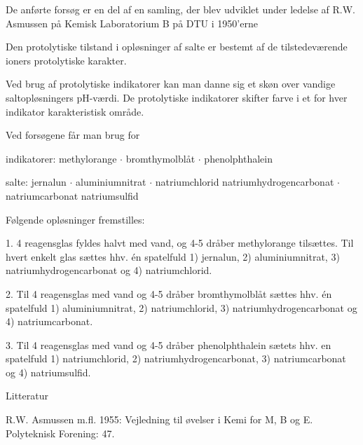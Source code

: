 



De anførte forsøg er en del af en samling, der blev udviklet under ledelse af R.W. Asmussen på Kemisk Laboratorium B på DTU i 1950'erne

Den protolytiske tilstand i opløsninger af salte er bestemt af de tilstedeværende ioners protolytiske karakter.

Ved brug af protolytiske indikatorer kan man danne sig et skøn over vandige saltopløsningers pH-værdi. De protolytiske indikatorer skifter farve i et for hver indikator karakteristisk område.



Ved forsøgene får man brug for

indikatorer: methylorange $\cdotp$ bromthymolblåt $\cdotp$ phenolphthalein

salte: jernalun $\cdotp$ aluminiumnitrat $\cdotp$ natriumchlorid
       natriumhydrogencarbonat $\cdotp$ natriumcarbonat
                                natriumsulfid




Følgende opløsninger fremstilles:

1. 4 reagensglas fyldes halvt med vand, og 4-5 dråber methylorange tilsættes. Til hvert enkelt glas sættes hhv. én spatelfuld 1) jernalun, 2) aluminiumnitrat, 3) natriumhydrogencarbonat og 4) natriumchlorid.

2. Til 4 reagensglas med vand og 4-5 dråber bromthymolblåt sættes hhv. én spatelfuld 1) aluminiumnitrat, 2) natriumchlorid, 3) natriumhydrogencarbonat og 4) natriumcarbonat.

3. Til 4 reagensglas med vand og 4-5 dråber phenolphthalein sætets hhv. en spatelfuld 1) natriumchlorid, 2) natriumhydrogencarbonat, 3) natriumcarbonat og 4) natriumsulfid.



Litteratur

R.W. Asmussen m.fl. 1955: Vejledning til øvelser i Kemi for M, B og E. Polyteknisk Forening: 47.
